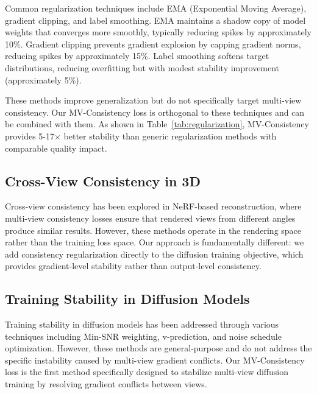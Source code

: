 \documentclass{article}
\begin{document}
Common regularization techniques include EMA (Exponential Moving Average), gradient clipping, and label smoothing. EMA maintains a shadow copy of model weights that converges more smoothly, typically reducing spikes by approximately 10\%. Gradient clipping prevents gradient explosion by capping gradient norms, reducing spikes by approximately 15\%. Label smoothing softens target distributions, reducing overfitting but with modest stability improvement (approximately 5\%).

These methods improve generalization but do not specifically target multi-view consistency. Our MV-Consistency loss is orthogonal to these techniques and can be combined with them. As shown in Table~\ref{tab:regularization}, MV-Consistency provides 5-17$\times$ better stability than generic regularization methods with comparable quality impact.

\subsection{Cross-View Consistency in 3D}

Cross-view consistency has been explored in NeRF-based reconstruction, where multi-view consistency losses ensure that rendered views from different angles produce similar results. However, these methods operate in the rendering space rather than the training loss space. Our approach is fundamentally different: we add consistency regularization directly to the diffusion training objective, which provides gradient-level stability rather than output-level consistency.

\subsection{Training Stability in Diffusion Models}

Training stability in diffusion models has been addressed through various techniques including Min-SNR weighting, v-prediction, and noise schedule optimization. However, these methods are general-purpose and do not address the specific instability caused by multi-view gradient conflicts. Our MV-Consistency loss is the first method specifically designed to stabilize multi-view diffusion training by resolving gradient conflicts between views.
\end{document}
